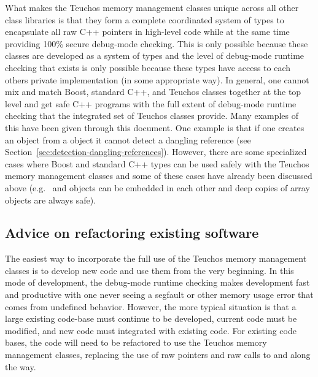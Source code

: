 \documentclass[pdf,ps2pdf,11pt]{SANDreport}
\begin{document}
What makes the Teuchos memory management classes unique across all
other class libraries is that they form a complete coordinated system
of types to encapsulate all raw C++ pointers in high-level code while
at the same time providing 100\% secure debug-mode checking.  This is
only possible because these classes are developed as a system of types
and the level of debug-mode runtime checking that exists is only
possible because these types have access to each others private
implementation (in some appropriate way).  In general, one cannot mix
and match Boost, standard C++, and Teuchos classes together at the top
level and get safe C++ programs with the full extent of debug-mode
runtime checking that the integrated set of Teuchos classes provide.
Many examples of this have been given through this document.  One
example is that if one creates an {} object from a
{} object it cannot detect a dangling reference (see
Section~\ref{sec:detection-dangling-references}).  However, there are
some specialized cases where Boost and standard C++ types can be used
safely with the Teuchos memory management classes and some of these
cases have already been discussed above (e.g.\ {} and
{} objects can be embedded in each other and
deep copies of array objects are always safe).


%
{}\subsection{Advice on refactoring existing software}
%

The easiest way to incorporate the full use of the Teuchos memory
management classes is to develop new code and use them from the very
beginning.  In this mode of development, the debug-mode runtime
checking makes development fast and productive with one never seeing a
segfault or other memory usage error that comes from undefined
behavior.  However, the more typical situation is that a large
existing code-base must continue to be developed, current code must be
modified, and new code must integrated with existing code.  For
existing code bases, the code will need to be refactored to use the
Teuchos memory management classes, replacing the use of raw pointers
and raw calls to {} and {} along the way.
\end{document}
